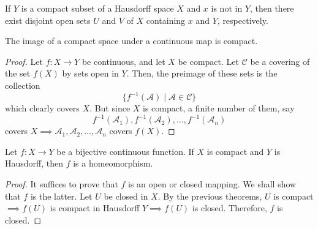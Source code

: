   \begin{lemma}
    If $Y$ is a compact subset of a Hausdorff space $X$ and $x$ is not in $Y$, then there exist disjoint open sets $U$ and $V$ of $X$ containing $x$ and $Y$, respectively. 

    \begin{figure}[H]
      \centering 
      \label{fig:hausdorff_compact}
    \end{figure}
  \end{lemma}


  \begin{theorem}
    The image of a compact space under a continuous map is compact.
  \end{theorem}
  \begin{proof}
    Let $f: X \rightarrow Y$ be continuous, and let $X$ be compact. Let $\mathcal{C}$ be a covering of the set $f(X)$ by sets open in $Y$. Then, the preimage of these sets is the collection
    \begin{equation}
      \{f^{-1}(\mathcal{A}) \; | \; \mathcal{A} \in \mathcal{C}\}
    \end{equation}
    which clearly covers $X$. But since $X$ is compact, a finite number of them, say
    \begin{equation}
      f^{-1} (\mathcal{A}_1), f^{-1} (\mathcal{A}_2), \ldots , f^{-1} (\mathcal{A}_n)
    \end{equation}
    covers $X \implies \mathcal{A}_1, \mathcal{A}_2, \ldots, \mathcal{A}_n$ covers $f(X)$. 
  \end{proof}

  \begin{theorem}
    Let $f: X \rightarrow Y$ be a bijective continuous function. If $X$ is compact and $Y$ is Hausdorff, then $f$ is a homeomorphism. 
  \end{theorem}
  \begin{proof}
    It suffices to prove that $f$ is an open or closed mapping. We shall show that $f$ is the latter. Let $U$ be closed in $X$. By the previous theorems, $U$ is compact $\implies f(U)$ is compact in Hausdorff $Y \implies f(U)$ is closed. Therefore, $f$ is closed. 
  \end{proof}

